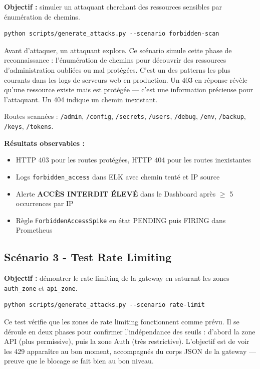 \documentclass[12pt, a4paper]{report}
\newcommand{\cmark}{\ding{51}}
\begin{document}
\textbf{Objectif :} simuler un attaquant cherchant des ressources sensibles par énumération de chemins.

\begin{lstlisting}[style=bash]
python scripts/generate_attacks.py --scenario forbidden-scan
\end{lstlisting}

\medskip
Avant d'attaquer, un attaquant explore. Ce scénario simule cette phase de reconnaissance : l'énumération de chemins pour découvrir des ressources d'administration oubliées ou mal protégées. C'est un des patterns les plus courants dans les logs de serveurs web en production. Un 403 en réponse révèle qu'une ressource existe mais est protégée — c'est une information précieuse pour l'attaquant. Un 404 indique un chemin inexistant.

Routes scannées : \texttt{/admin}, \texttt{/config}, \texttt{/secrets}, \texttt{/users}, \texttt{/debug}, \texttt{/env}, \texttt{/backup}, \texttt{/keys}, \texttt{/tokens}.

\textbf{Résultats observables :}
\begin{itemize}[leftmargin=*]
  \item[\cmark] HTTP 403 pour les routes protégées, HTTP 404 pour les routes inexistantes
  \item[\cmark] Logs \texttt{forbidden\_access} dans ELK avec chemin tenté et IP source
  \item[\cmark] Alerte \textbf{ACCÈS INTERDIT ÉLEVÉ} dans le Dashboard après $\geq$ 5 occurrences par IP
  \item[\cmark] Règle \texttt{ForbiddenAccessSpike} en état PENDING puis FIRING dans Prometheus
\end{itemize}

\subsection{Scénario 3 - Test Rate Limiting}

\textbf{Objectif :} démontrer le rate limiting de la gateway en saturant les zones \texttt{auth\_zone} et \texttt{api\_zone}.

\begin{lstlisting}[style=bash]
python scripts/generate_attacks.py --scenario rate-limit
\end{lstlisting}

\medskip
Ce test vérifie que les zones de rate limiting fonctionnent comme prévu. Il se déroule en deux phases pour confirmer l'indépendance des seuils : d'abord la zone API (plus permissive), puis la zone Auth (très restrictive). L'objectif est de voir les 429 apparaître au bon moment, accompagnés du corps JSON de la gateway — preuve que le blocage se fait bien au bon niveau.
\end{document}
